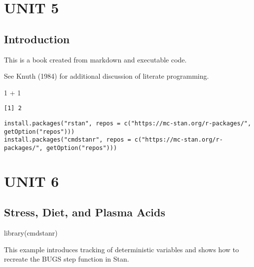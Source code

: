 \documentclass[
  letterpaper,
  DIV=11,
  numbers=noendperiod]{scrreprt}
\newenvironment{Shaded}{\begin{snugshade}}{\end{snugshade}}
\newcommand{\DecValTok}[1]{\textcolor[rgb]{0.68,0.00,0.00}{#1}}
\newcommand{\FunctionTok}[1]{\textcolor[rgb]{0.28,0.35,0.67}{#1}}
\newcommand{\NormalTok}[1]{\textcolor[rgb]{0.00,0.23,0.31}{#1}}
\newcommand{\SpecialCharTok}[1]{\textcolor[rgb]{0.37,0.37,0.37}{#1}}
\begin{document}
\part{UNIT 5}

\hypertarget{introduction-3}{%
\chapter{Introduction}\label{introduction-3}}

This is a book created from markdown and executable code.

See Knuth (1984) for additional discussion of literate programming.

\begin{Shaded}
\begin{Highlighting}[]
\DecValTok{1} \SpecialCharTok{+} \DecValTok{1}
\end{Highlighting}
\end{Shaded}

\begin{verbatim}
[1] 2
\end{verbatim}

\begin{verbatim}
install.packages("rstan", repos = c("https://mc-stan.org/r-packages/", getOption("repos")))
install.packages("cmdstanr", repos = c("https://mc-stan.org/r-packages/", getOption("repos")))
\end{verbatim}

\part{UNIT 6}

\hypertarget{stress-diet-and-plasma-acids}{%
\chapter*{Stress, Diet, and Plasma
Acids}\label{stress-diet-and-plasma-acids}}


\begin{Shaded}
\begin{Highlighting}[]
\FunctionTok{library}\NormalTok{(cmdstanr)}
\end{Highlighting}
\end{Shaded}

This example introduces tracking of deterministic variables and shows
how to recreate the BUGS step function in Stan.
\end{document}
